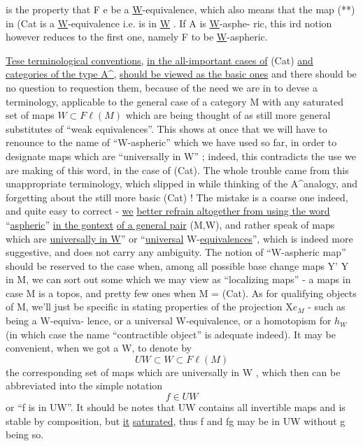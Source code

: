 
is the property that F\hand{$\to$} e be a \underline{W}-equivalence, which also means that
the map (**) in (Cat\hand{)} is a \underline{W}-equivalence i.e. is in \underline{W} . If A is \underline{W}-asphe-%
ric, this ird notion however reduces to the first one, namely F to
be \underline{W}-aspheric.

\uline{Tese terminological conventions,} \uline{in the all-important cases of}
(Cat) \uline{and categories of the type A\textasciicircum,} \uline{should be viewed as the basic ones}\hand{,}
and there should be no question  to requestion them, because of the
need we  are in to devse a terminology, applicable to the general
case of a category M  with any saturated set of maps $W \subset F\ell(M)$\hand{,}
\hand{(}which are being thought of as still more general substitutes of ``weak
equivalences''\hand{)}. This shows at once that we will have to renounce to the
name of ``W-aspheric'' which we have used so far, in order to designate
maps which are ``universally in W'' ; indeed, this contradicts the use we
are making of this word, in the case of (Cat). The whole trouble came
from this unappropriate terminology, which slipped in while thinking
of the A\textasciicircum\hand{/}analogy, and forgetting about the still more basic (Cat) !
The mistake is a coarse one indeed, and quite easy to correct - \uline{we}
\uline{better refrain altogether from using the word} ``\uline{aspheric}'' \uline{in the gontext}
\uline{of a general pair} (M,W),  and rather speak of maps which are
\uline{universally in W}'' or ``\uline{universal} W-\uline{equivalences}'', which is indeed more
suggestive, and does not carry any ambiguity. The notion of ``W-aspheric
map'' should be reserved to the case when, among all possible base change
maps Y' \hand{$\to$}Y in M, we can sort out some which we may view as ``localizing
maps'' - a maps  in case M is a topos, and pretty few ones when
M = (Cat). As for qualifying objects of M, we'll just be specific in
stating properties of the projection X\hand{$\to$}$e_{M}$ - such as being a W-equiva-%
lence, or a universal W-equivalence, or a homotopism for $h_{W}$ (in which
case the name ``contractible object'' is adequate indeed). It may be
convenient, when we got a W, to denote by 
\[ UW \subset W \subset F\ell(M) \]
the corresponding set of maps which are universally in W ,  which then
can be abbreviated into the simple notation
\[ f \in UW \]
or ``f is in UW''. It should be notes that UW contains all invertible
maps and is stable by composition, but \uline{it}  \uline{saturated}, thus f and 
fg may be in UW without g being so.

